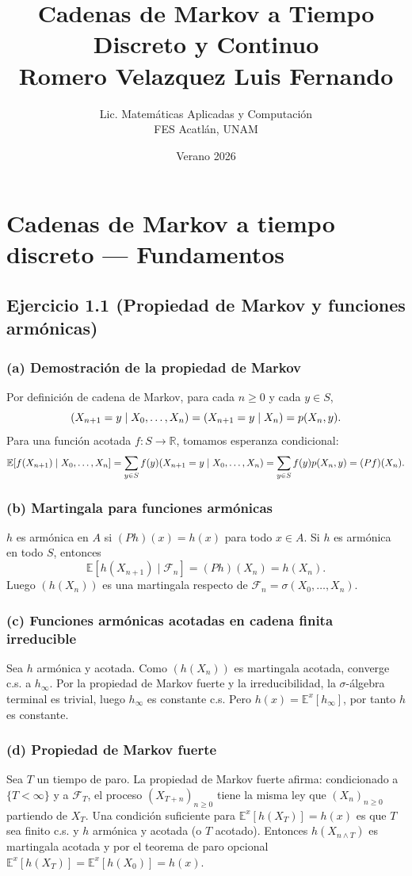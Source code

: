 \documentclass[12pt]{article}
\title{Cadenas de Markov a Tiempo Discreto y Continuo\\\large Romero Velazquez Luis Fernando}
\author{Lic. Matem\'aticas Aplicadas y Computaci\'on\\FES Acatl\'an, UNAM}
\date{Verano 2026}
\let\P\relax
\newcommand{\P}{\mathbb{P}}
\newcommand{\E}{\mathbb{E}}
\newcommand{\R}{\mathbb{R}}
\newcommand{\1}{\mathbf{1}}
\newcommand{\F}{\mathcal{F}}
\begin{document}
\maketitle
\tableofcontents

\section{Cadenas de Markov a tiempo discreto — Fundamentos}

\subsection{Ejercicio 1.1 (Propiedad de Markov y funciones arm\'onicas)}

\subsubsection*{(a) Demostraci\'on de la propiedad de Markov}
Por definici\'on de cadena de Markov, para cada $n\ge0$ y cada $y\in S$,
\[
\P(X_{n+1}=y\mid X_0,\dots,X_n)=\P(X_{n+1}=y\mid X_n)=p(X_n,y).
\]
Para una funci\'on acotada $f:S\to\R$, tomamos esperanza condicional:
\[
\E[f(X_{n+1})\mid X_0,\dots,X_n]=\sum_{y\in S}f(y)\P(X_{n+1}=y\mid X_0,\dots,X_n)
=\sum_{y\in S}f(y)p(X_n,y)=(Pf)(X_n).
\]

\subsubsection*{(b) Martingala para funciones arm\'onicas}
$h$ es arm\'onica en $A$ si $(Ph)(x)=h(x)$ para todo $x\in A$. Si $h$ es arm\'onica en todo $S$, entonces
\[
\E[h(X_{n+1})\mid\F_n]=(Ph)(X_n)=h(X_n).
\]
Luego $(h(X_n))$ es una martingala respecto de $\F_n=\sigma(X_0,\dots,X_n)$.

\subsubsection*{(c) Funciones arm\'onicas acotadas en cadena finita irreducible}
Sea $h$ arm\'onica y acotada. Como $(h(X_n))$ es martingala acotada, converge c.s. a $h_\infty$. Por la propiedad de Markov fuerte y la irreducibilidad, la $\sigma$-álgebra terminal es trivial, luego $h_\infty$ es constante c.s. Pero $h(x)=\E^x[h_\infty]$, por tanto $h$ es constante.

\subsubsection*{(d) Propiedad de Markov fuerte}
Sea $T$ un tiempo de paro. La propiedad de Markov fuerte afirma: condicionado a $\{T<\infty\}$ y a $\F_T$, el proceso $(X_{T+n})_{n\ge0}$ tiene la misma ley que $(X_n)_{n\ge0}$ partiendo de $X_T$. Una condici\'on suficiente para $\E^x[h(X_T)]=h(x)$ es que $T$ sea finito c.s. y $h$ arm\'onica y acotada (o $T$ acotado). Entonces $h(X_{n\wedge T})$ es martingala acotada y por el teorema de paro opcional $\E^x[h(X_T)]=\E^x[h(X_0)]=h(x)$.
\end{document}
